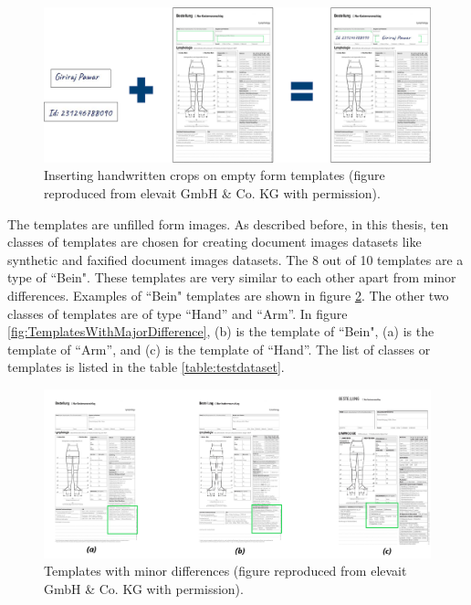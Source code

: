 \begin{figure}[H]
        \begin{center}
	    \includegraphics[scale=0.40]{images/Implementation/InsertHandwrittenCrops.png}
	    \caption[Inserting handwritten crops on empty form templates.]{Inserting handwritten crops on empty form templates (figure reproduced from elevait GmbH \& Co. KG with permission).}
	    \label{fig:InsertHandwrittenCrops}
	    \end{center}
\end{figure}



The templates are unfilled form images. As described before, in this thesis, ten classes of templates are chosen for creating document images datasets like synthetic and faxified document images datasets. The 8 out of 10 templates are a type of ``Bein". These templates are very similar to each other apart from minor differences. Examples of ``Bein" templates are shown in figure \ref{fig:TemplatesWithMinorDifference}. The other two classes of templates are of type ``Hand'' and ``Arm''. In figure \ref{fig:TemplatesWithMajorDifference}, (b) is the template of ``Bein", (a) is the template of ``Arm'', and (c) is the template of ``Hand''. The list of classes or templates is listed in the table \ref{table:testdataset}.

\begin{figure}[H]
        \begin{center}
	    \includegraphics[scale=0.30]{images/Implementation/TemplatesWithMinorDifference.png}
	    \caption[Templates with minor differences.]{Templates with minor differences (figure reproduced from elevait GmbH \& Co. KG with permission).}
	    \label{fig:TemplatesWithMinorDifference}
	    \end{center}
\end{figure}



